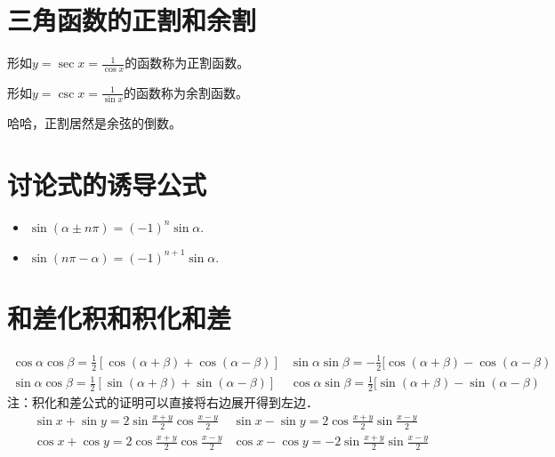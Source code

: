 \section{三角函数的正割和余割}

\begin{definition}[正割函数]
    形如$y=\sec x = \frac{1}{\cos x}$的函数称为正割函数。
\end{definition}

\begin{definition}[余割函数]
    形如$y=\csc x = \frac{1}{\sin x}$的函数称为余割函数。
\end{definition}

\begin{tips}
    哈哈，正割居然是余弦的倒数。
\end{tips}

\section{讨论式的诱导公式}

\begin{theorem}
    \begin{itemize}
        \item     $\sin (\alpha \pm n \pi)=(-1)^n \sin \alpha$.
        \item     $\sin (n \pi-\alpha)=(-1)^{n+1} \sin \alpha$.
    \end{itemize}
\end{theorem}

\section{和差化积和积化和差}

\begin{theorem}
    $$
        \begin{array}{ll}
            \cos \alpha \cos \beta=\frac{1}{2}[\cos (\alpha+\beta)+\cos (\alpha-\beta)] & \sin \alpha \sin \beta=-\frac{1}{2}[\cos (\alpha+\beta)-\cos (\alpha-\beta) \\
            \sin \alpha \cos \beta=\frac{1}{2}[\sin (\alpha+\beta)+\sin (\alpha-\beta)] & \cos \alpha \sin \beta=\frac{1}{2}[\sin (\alpha+\beta)-\sin (\alpha-\beta)
        \end{array}
    $$
    注：积化和差公式的证明可以直接将右边展开得到左边．
    $$
        \begin{array}{ll}
            \sin x+\sin y=2 \sin \frac{x+y}{2} \cos \frac{x-y}{2} & \sin x-\sin y=2 \cos \frac{x+y}{2} \sin \frac{x-y}{2}  \\
            \cos x+\cos y=2 \cos \frac{x+y}{2} \cos \frac{x-y}{2} & \cos x-\cos y=-2 \sin \frac{x+y}{2} \sin \frac{x-y}{2}
        \end{array}
    $$
\end{theorem}

